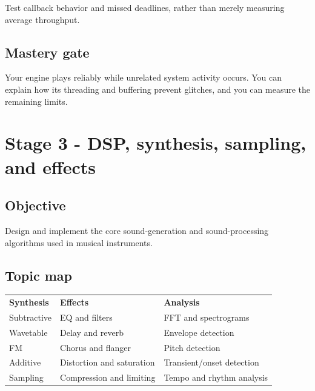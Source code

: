 \documentclass[11pt,letterpaper]{article}
\begin{document}
Test callback behavior and missed deadlines, rather than merely measuring average throughput.

\subsection*{Mastery gate}\label{mastery-gate-2}

Your engine plays reliably while unrelated system activity occurs. You can explain how its threading and buffering prevent glitches, and you can measure the remaining limits.

\clearpage

\section{Stage 3 - DSP, synthesis, sampling, and effects}\label{stage-3-dsp-synthesis-sampling-and-effects}

\subsection*{Objective}\label{objective-3}

Design and implement the core sound-generation and sound-processing algorithms used in musical instruments.

\subsection*{Topic map}\label{topic-map}

\begin{center}
\small
\begin{tabular}{>{\raggedright\arraybackslash}p{}>{\raggedright\arraybackslash}p{}>{\raggedright\arraybackslash}p{}}
\textbf{Synthesis} & \textbf{Effects} & \textbf{Analysis} \\
Subtractive & EQ and filters & FFT and spectrograms \\
Wavetable & Delay and reverb & Envelope detection \\
FM & Chorus and flanger & Pitch detection \\
Additive & Distortion and saturation & Transient/onset detection \\
Sampling & Compression and limiting & Tempo and rhythm analysis \\
\end{tabular}
\end{center}
\end{document}
